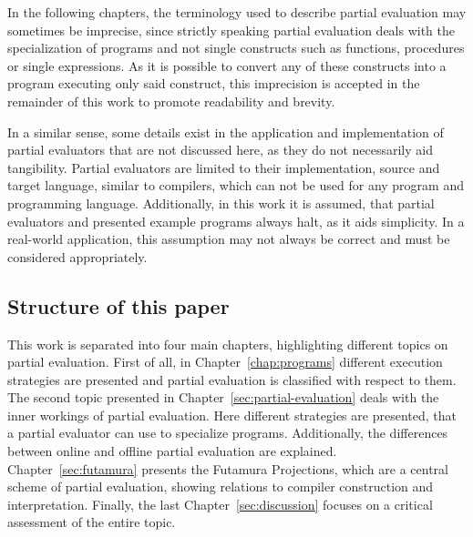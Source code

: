 In the following chapters, the terminology used to describe partial evaluation may sometimes be imprecise, since strictly speaking partial evaluation deals with the specialization of programs and not single constructs such as functions, procedures or single expressions.
As it is possible to convert any of these constructs into a program executing only said construct, this imprecision is accepted in the remainder of this work to promote readability and brevity.

In a similar sense, some details exist in the application and implementation of partial evaluators that are not discussed here, as they do not necessarily aid tangibility.
Partial evaluators are limited to their implementation, source and target language, similar to compilers, which can not be used for any program and programming language.
Additionally, in this work it is assumed, that partial evaluators and presented example programs always halt, as it aids simplicity.
In a real-world application, this assumption may not always be correct and must be considered appropriately.

\subsection{Structure of this paper}

This work is separated into four main chapters, highlighting different topics on partial evaluation.
First of all, in Chapter~\ref{chap:programs} different execution strategies are presented and partial evaluation is classified with respect to them.
The second topic presented in Chapter~\ref{sec:partial-evaluation} deals with the inner workings of partial evaluation.
Here different strategies are presented, that a partial evaluator can use to specialize programs.
Additionally, the differences between online and offline partial evaluation are explained.
Chapter~\ref{sec:futamura} presents the Futamura Projections, which are a central scheme of partial evaluation, showing relations to compiler construction and interpretation.
Finally, the last Chapter~\ref{sec:discussion} focuses on a critical assessment of the entire topic.

